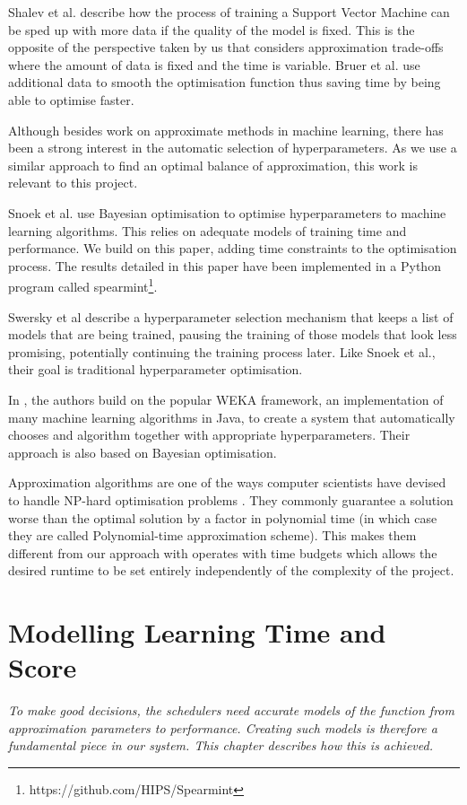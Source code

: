 \documentclass[a4paper,12pt,twoside,openright]{report}
\begin{document}
Shalev et al. \cite{Shalev-Shwartz:2008:SOI:1390156.1390273} describe how the process of training a Support Vector Machine can be sped up with more data if the quality of the model is fixed. This is the opposite of the perspective taken by us that considers approximation trade-offs where the amount of data is fixed and the time is variable. Bruer et al. \cite{NIPS2014_5259} use additional data to smooth the optimisation function thus saving time by being able to optimise faster.

Although besides work on approximate methods in machine learning, there has been a strong interest in the automatic selection of hyperparameters. As we use a similar approach to find an optimal balance of approximation, this work is relevant to this project.

Snoek et al. \cite{PracticalBayesianOptimization} use Bayesian optimisation to optimise hyperparameters to machine learning algorithms. This relies on adequate models of training time and performance. We build on this paper, adding time constraints to the optimisation process. The results detailed in this paper have been implemented in a Python program called spearmint\footnote{https://github.com/HIPS/Spearmint}.

Swersky et al \cite{2014arXiv1406.3896S} describe a hyperparameter selection mechanism that keeps a list of models that are being trained, pausing the training of those models that look less promising, potentially continuing the training process later. Like Snoek et al., their goal is traditional hyperparameter optimisation.

In \cite{ThoHutHooLey13-AutoWEKA}, the authors build on the popular WEKA framework, an implementation of many machine learning algorithms in Java, to create a system that automatically chooses and algorithm together with appropriate hyperparameters. Their approach is also based on Bayesian optimisation.

Approximation algorithms are one of the ways computer scientists have devised to handle NP-hard optimisation problems \cite{Vazirani:2001:AA:500776}. They commonly guarantee a solution worse than the optimal solution by a factor in polynomial time (in which case they are called Polynomial-time approximation scheme). This makes them different from our approach with operates with time budgets which allows the desired runtime to be set entirely independently of the complexity of the project.




\chapter{Modelling Learning Time and Score}
\label{ch:modelling}
\textit{To make good decisions, the schedulers need accurate models of the function from approximation parameters to performance. Creating such models is therefore a fundamental piece in our system. This chapter describes how this is achieved.}
\end{document}
